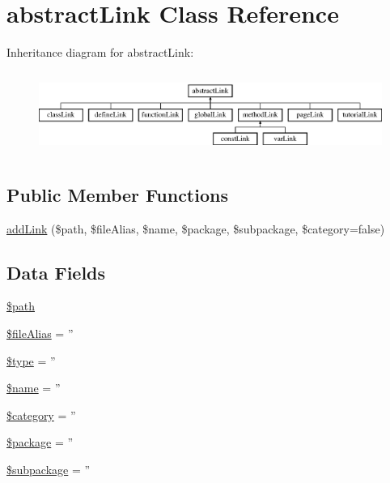 \hypertarget{classabstract_link}{\section{abstract\-Link \-Class \-Reference}
\label{classabstract_link}
}
\-Inheritance diagram for abstract\-Link\-:\begin{figure}[H]
\begin{center}
\leavevmode
\includegraphics[height=2.727273cm]{classabstract_link}
\end{center}
\end{figure}
\subsection*{\-Public \-Member \-Functions}
\begin{DoxyCompactItemize}
\item 
\hyperlink{classabstract_link_a177b632b658286fdef3533477cdcfbaf}{add\-Link} (\$path, \$file\-Alias, \$name, \$package, \$subpackage, \$category=false)
\end{DoxyCompactItemize}
\subsection*{\-Data \-Fields}
\begin{DoxyCompactItemize}
\item 
\hyperlink{classabstract_link_a0a4baf0b22973c07685c3981f0d17fc4}{\$path}
\item 
\hyperlink{classabstract_link_ac31de7b4a69da02b039d84655a9f28e9}{\$file\-Alias} = ''
\item 
\hyperlink{classabstract_link_a9a4a6fba2208984cabb3afacadf33919}{\$type} = ''
\item 
\hyperlink{classabstract_link_ab2fc40d43824ea3e1ce5d86dee0d763b}{\$name} = ''
\item 
\hyperlink{classabstract_link_a18b2a8d133fa7733bf34abcc6ca2ef5b}{\$category} = ''
\item 
\hyperlink{classabstract_link_a365395516cc195292e97e09bc0d165ae}{\$package} = ''
\item 
\hyperlink{classabstract_link_ac601dc8dc2a086b6381128cc9c7a3fc5}{\$subpackage} = ''
\end{DoxyCompactItemize}



